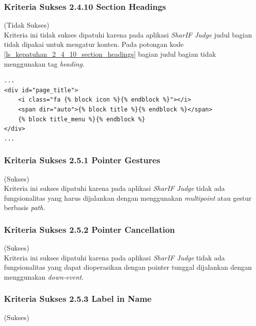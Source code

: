 \documentclass[a4paper,twoside]{article}
\begin{document}
\begin{enumerate}
\begin{itemize}
		\end{itemize}
		
		\subsubsection*{Kriteria Sukses 2.4.10 Section Headings}
		\label{subsubsec:kepatuhan_kriteria_2.4.10}
		(Tidak Sukses) \\
		
		Kriteria ini tidak sukses dipatuhi karena pada aplikasi \textit{SharIF Judge} judul bagian tidak dipakai untuk mengatur konten. Pada potongan kode \ref{ls_kepatuhan_2_4_10_section_headings} bagian judul bagian tidak menggunakan tag \textit{heading}.
		\begin{lstlisting}[basicstyle=\ttfamily, frame=single,
		columns=fullflexible, keepspaces=true, breaklines=true, label=ls_kepatuhan_2_4_10_section_headings, caption=Kriteria Sukses 2.4.10 - Title Heading]
...
<div id="page_title">
	<i class="fa {% block icon %}{% endblock %}"></i>
	<span dir="auto">{% block title %}{% endblock %}</span>
	{% block title_menu %}{% endblock %}
</div>
...
		\end{lstlisting}
		
		\subsubsection*{Kriteria Sukses 2.5.1 Pointer Gestures}
		\label{subsubsec:kepatuhan_kriteria_2.5.1}
		(Sukses) \\
		
		Kriteria ini sukses dipatuhi karena pada aplikasi \textit{SharIF Judge} tidak ada fungsionalitas yang harus dijalankan dengan menggunakan \textit{multipoint} atau gestur berbasis \textit{path}.
		
		\subsubsection*{Kriteria Sukses 2.5.2 Pointer Cancellation}
		\label{subsubsec:kepatuhan_kriteria_2.5.2}
		(Sukses) \\
		
		Kriteria ini sukses dipatuhi karena pada aplikasi \textit{SharIF Judge} tidak ada fungsionalitas yang dapat dioperasikan dengan pointer tunggal dijalankan dengan menggunakan \textit{down-event}.
		
		\subsubsection*{Kriteria Sukses 2.5.3 Label in Name}
		\label{subsubsec:kepatuhan_kriteria_2.5.3}
		(Sukses) \\
		

\end{enumerate}
\end{document}
